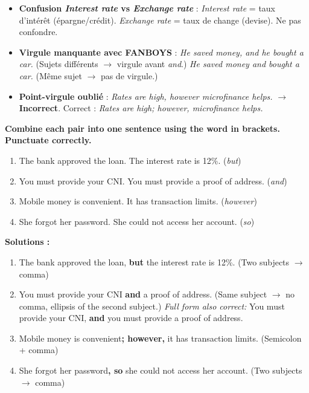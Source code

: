 \documentclass[11pt]{article}
\begin{document}
\begin{attention}
\begin{itemize}
\item \textbf{Confusion \emph{Interest rate} vs \emph{Exchange rate}} : \emph{Interest rate} = taux d'intérêt (épargne/crédit). \emph{Exchange rate} = taux de change (devise). Ne pas confondre.
\item \textbf{Virgule manquante avec FANBOYS} : \emph{He saved money, and he bought a car.} (Sujets différents $\rightarrow$ virgule avant \emph{and}.) \emph{He saved money and bought a car.} (Même sujet $\rightarrow$ pas de virgule.)
\item \textbf{Point-virgule oublié} : \emph{Rates are high, however microfinance helps.} $\rightarrow$ \textbf{Incorrect}. Correct : \emph{Rates are high; however, microfinance helps.}
\end{itemize}
\end{attention}

\begin{exoresolu}
\textbf{Combine each pair into one sentence using the word in brackets. Punctuate correctly.}
\begin{enumerate}
\item The bank approved the loan. The interest rate is 12\%. (\emph{but})
\item You must provide your CNI. You must provide a proof of address. (\emph{and})
\item Mobile money is convenient. It has transaction limits. (\emph{however})
\item She forgot her password. She could not access her account. (\emph{so})
\end{enumerate}
\tcblower
\textbf{Solutions :}
\begin{enumerate}
\item The bank approved the loan, \textbf{but} the interest rate is 12\%. (Two subjects $\rightarrow$ comma)
\item You must provide your CNI \textbf{and} a proof of address. (Same subject $\rightarrow$ no comma, ellipsis of the second subject.) \textit{Full form also correct:} You must provide your CNI, \textbf{and} you must provide a proof of address.
\item Mobile money is convenient\textbf{; however,} it has transaction limits. (Semicolon + comma)
\item She forgot her password\textbf{, so} she could not access her account. (Two subjects $\rightarrow$ comma)
\end{enumerate}
\end{exoresolu}
\end{document}
